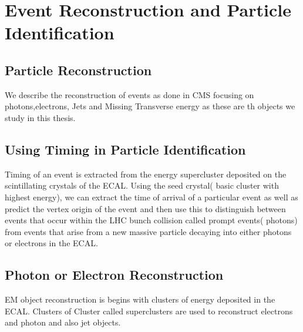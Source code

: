 \chapter{Event Reconstruction and Particle Identification}
\label{reconstruction_and Particle_ID_chapter}
\section{Particle Reconstruction}
We describe the reconstruction of events as done in CMS focusing on photons,electrons, Jets and Missing Transverse energy
as these are th objects we study in this thesis.
\section{Using Timing in Particle Identification}
Timing of an event is extracted from the energy supercluster deposited on the
scintillating crystals of the ECAL. Using the seed crystal( basic cluster with highest energy), we can extract the time of arrival of a particular event as well as predict the vertex origin of the event and then use this to distinguish between events that occur within the LHC bunch collision called prompt events( photons)  from
events that arise from a new massive particle decaying into either photons or electrons in the ECAL.



\section{Photon or Electron Reconstruction}
EM object reconstruction is begins with clusters of energy deposited in the ECAL. Clusters of Cluster called superclusters are used to reconstruct electrons and photon and also jet objects.
